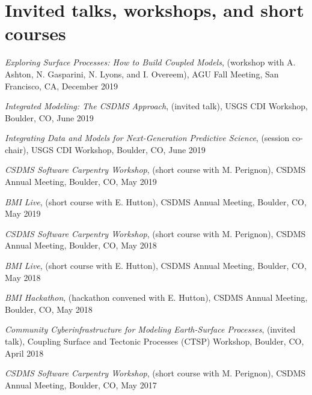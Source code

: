 \section{Invited talks, workshops, and short courses}
\vspace{0.5em}

\begin{enumerate}[{[}1{]}]

  \item \textit{Exploring Surface Processes: How to Build Coupled
    Models}, (workshop with A. Ashton, N. Gasparini, N. Lyons, and
    I. Overeem), AGU Fall Meeting, San Francisco, CA, December 2019

  \item \textit{Integrated Modeling: The CSDMS Approach}, (invited
    talk), USGS CDI Workshop, Boulder, CO, June 2019

  \item \textit{Integrating Data and Models for Next-Generation
    Predictive Science}, (session co-chair), USGS CDI Workshop,
    Boulder, CO, June 2019
    
  \item \textit{CSDMS Software Carpentry Workshop}, (short course with
    M. Perignon), CSDMS Annual Meeting, Boulder, CO, May 2019

  \item \textit{BMI Live}, (short course with E. Hutton),
    CSDMS Annual Meeting, Boulder, CO, May 2019

  \item \textit{CSDMS Software Carpentry Workshop}, (short course with
    M. Perignon), CSDMS Annual Meeting, Boulder, CO, May 2018

  \item \textit{BMI Live}, (short course with E. Hutton),
    CSDMS Annual Meeting, Boulder, CO, May 2018

  \item \textit{BMI Hackathon}, (hackathon convened with E. Hutton),
    CSDMS Annual Meeting, Boulder, CO, May 2018

  \item \textit{Community Cyberinfrastructure for Modeling
    Earth-Surface Processes}, (invited talk), Coupling Surface and
    Tectonic Processes (CTSP) Workshop, Boulder, CO, April 2018

  \item \textit{CSDMS Software Carpentry Workshop}, (short course with
    M. Perignon), CSDMS Annual Meeting, Boulder, CO, May 2017


\end{enumerate}
